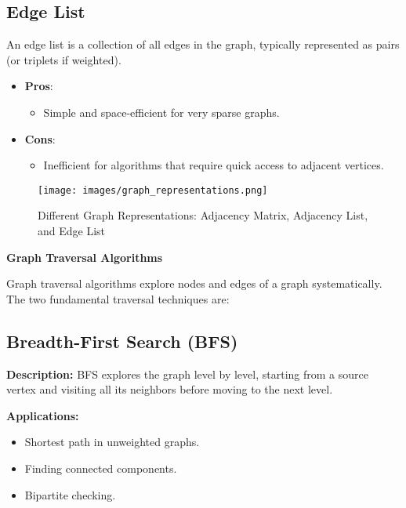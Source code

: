 \subsection{Edge List}

An edge list is a collection of all edges in the graph, typically represented as pairs (or triplets if weighted).

\begin{itemize}
    \item \textbf{Pros}:
    \begin{itemize}
        \item Simple and space-efficient for very sparse graphs.
    \end{itemize}
    \item \textbf{Cons}:
    \begin{itemize}
        \item Inefficient for algorithms that require quick access to adjacent vertices.
    \end{itemize}
\end{itemize}

\begin{figure}[ht]
    \centering
    \texttt{[image: images/graph\_representations.png]}
    \caption{Different Graph Representations: Adjacency Matrix, Adjacency List, and Edge List}
    \label{fig:graph_representations}
\end{figure}

\textbf{Graph Traversal Algorithms}

Graph traversal algorithms explore nodes and edges of a graph systematically. The two fundamental traversal techniques are:

\subsection{Breadth-First Search (BFS)}

\textbf{Description:}  
BFS explores the graph level by level, starting from a source vertex and visiting all its neighbors before moving to the next level.

\textbf{Applications:}
\begin{itemize}
    \item Shortest path in unweighted graphs.
    \item Finding connected components.
    \item Bipartite checking.
\end{itemize}

